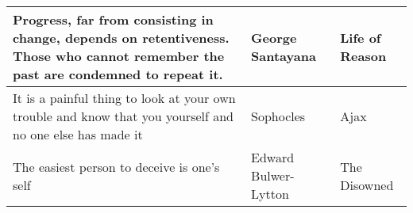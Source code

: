 \documentclass{article}
\begin{document}
\begin{tabularx}{0.8\textwidth} { 
  | >{\centering\arraybackslash}X 
  | >{\centering\arraybackslash}X 
  |  >{\centering\arraybackslash}X |}
    Progress, far from consisting in change, depends on retentiveness. Those who cannot remember the past are condemned to repeat it.
    & George Santayana
    & Life of Reason\\

    \hline

    It is a painful thing to look at your own trouble and know that you yourself and no one else has made it 
    & Sophocles 
    & Ajax \\

    \hline

    The easiest person to deceive is one's self 
    & Edward Bulwer-Lytton 
    & The Disowned \\

    \hline


  
  \end{tabularx}
\end{document}
